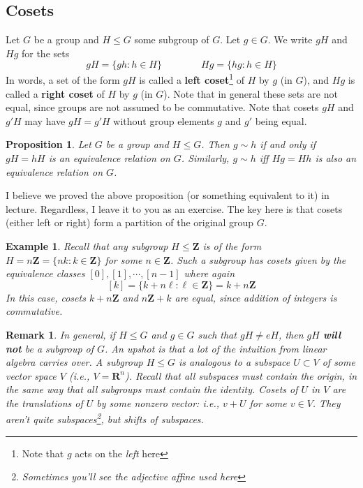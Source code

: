 \documentclass[12pt]{article}
\numberwithin{equation}{subsection}
\newtheorem{prop}[subsection]{Proposition}
\theoremstyle{note}
\newtheorem{example}[subsection]{Example}
\newtheorem{remark}[subsection]{Remark}
\begin{document}
\subsection{Cosets}

Let $G$ be a group and $H\leq G$ some subgroup of $G$. Let $g\in G$. We write $gH$ and $Hg$ for the sets \begin{equation} gH=\{gh : h\in H\} \qquad \qquad Hg=\{hg: h\in H\} \end{equation}
In words, a set of the form $gH$ is called a \textbf{left coset}\footnote{Note that $g$ acts on the \textit{left} here} of $H$ by $g$ (in $G$), and $Hg$ is called a \textbf{right coset} of $H$ by $g$ (in $G$).  Note that in general these sets are not equal, since groups are not assumed to be commutative. Note that cosets $gH$ and $g'H$ may have $gH=g'H$ without group elements $g$ and $g'$ being equal. 

\begin{prop}
	Let $G$ be a group and $H\leq G$. Then $g\sim h$ if and only if $gH=hH$ is an equivalence relation on $G$. Similarly, $g\sim h$ iff $Hg=Hh$ is also an equivalence relation on $G$.
\end{prop}

I believe we proved the above proposition (or something equivalent to it) in lecture. Regardless, I leave it to you as an exercise. The key here is that cosets (either left or right) form a partition of the original group $G$. 

\begin{example} Recall that any subgroup $H\leq \mathbf{Z}$ is of the form $H=n\mathbf{Z}=\{nk: k\in \mathbf{Z}\}$ for some $n\in \mathbf{Z}$. Such a subgroup has cosets given by the equivalence classes $[0], [1], \cdots, [n-1]$ where again \[ [k]=\{k+n\ell : \ell\in\mathbf{Z}\}=k+n\mathbf{Z}\]
In this case, cosets $k+n\mathbf{Z}$ and $n\mathbf{Z}+k$ are equal, since addition of integers is commutative. 
\end{example}

\begin{remark}
	 In general, if $H\leq G$ and $g\in G$ such that $gH\neq eH$, then $gH$ \textbf{will not} be a subgroup of $G$. An upshot is that a lot of the intuition from linear algebra carries over. A subgroup $H\leq G$ is analogous to a \textit{subspace} $U\subset V$ of some vector space $V$ (i.e., $V=\mathbf{R}^n$). Recall that all subspaces must contain the origin, in the same way that all subgroups must contain the identity. Cosets of $U$ in $V$ are the translations of $U$ by some nonzero vector: i.e., $v+U$ for some $v\in V$. They aren't quite subspaces\footnote{Sometimes you'll see the adjective \textit{affine} used here}, but \textit{shifts} of subspaces.
\end{remark}
\end{document}
